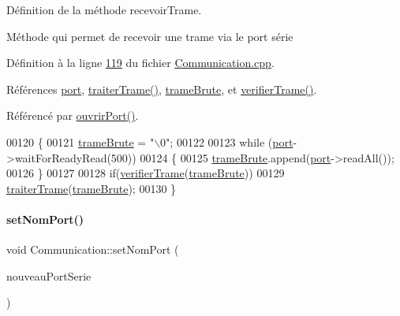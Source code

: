 Définition de la méthode recevoir\+Trame. 

Méthode qui permet de recevoir une trame via le port série 

Définition à la ligne \hyperlink{_communication_8cpp_source_l00119}{119} du fichier \hyperlink{_communication_8cpp_source}{Communication.\+cpp}.



Références \hyperlink{_communication_8h_source_l00067}{port}, \hyperlink{_communication_8cpp_source_l00158}{traiter\+Trame()}, \hyperlink{_communication_8h_source_l00068}{trame\+Brute}, et \hyperlink{_communication_8cpp_source_l00138}{verifier\+Trame()}.



Référencé par \hyperlink{_communication_8cpp_source_l00078}{ouvrir\+Port()}.


\begin{DoxyCode}
00120 \{
00121     \hyperlink{class_communication_a7a55775be5e16249315fe5faef4f13b4}{trameBrute} = \textcolor{stringliteral}{"\(\backslash\)0"};
00122 
00123     \textcolor{keywordflow}{while} (\hyperlink{class_communication_aff7d55208f31232fbdc1dcec488908f1}{port}->waitForReadyRead(500))
00124     \{
00125         \hyperlink{class_communication_a7a55775be5e16249315fe5faef4f13b4}{trameBrute}.append(\hyperlink{class_communication_aff7d55208f31232fbdc1dcec488908f1}{port}->readAll());
00126     \}    
00127 
00128     \textcolor{keywordflow}{if}(\hyperlink{class_communication_a3958c8f275ff8d50dca85afe65c795d1}{verifierTrame}(\hyperlink{class_communication_a7a55775be5e16249315fe5faef4f13b4}{trameBrute}))
00129         \hyperlink{class_communication_ab4ff84d0fb69ffa990bc61939c95a093}{traiterTrame}(\hyperlink{class_communication_a7a55775be5e16249315fe5faef4f13b4}{trameBrute});
00130 \}
\end{DoxyCode}
\mbox{\label{class_communication_a06a0f05f4555c6e3586e1800bbaa5e13}} 
\paragraph{\texorpdfstring{set\+Nom\+Port()}{setNomPort()}}
{\footnotesize\ttfamily void Communication\+::set\+Nom\+Port (\begin{DoxyParamCaption}\item[{Q\+String}]{nouveau\+Port\+Serie }\end{DoxyParamCaption})}



